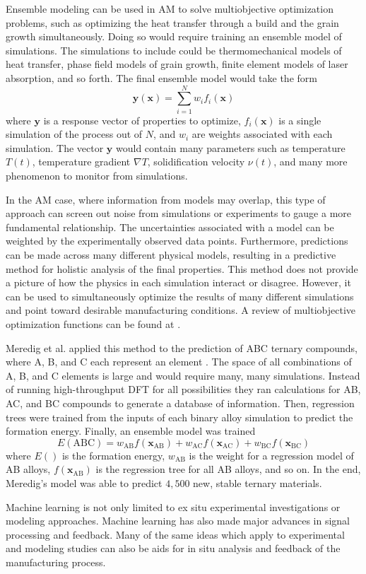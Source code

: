 Ensemble modeling can be used in AM to solve multiobjective optimization problems, such as optimizing the heat transfer through a build and the grain growth simultaneously. Doing so would require training an ensemble model of simulations. The simulations to include could be thermomechanical models of heat transfer, phase field models of grain growth, finite element models of laser absorption, and so forth. The final ensemble model would take the form
\begin{equation}
	\mathbf{y}(\mathbf{x}) = \sum_{i=1}^N w_i f_i(\mathbf{x})
	\label{ensemble}
\end{equation}
where $\mathbf{y}$ is a response vector of properties to optimize, $f_i(\mathbf{x})$ is a single simulation of the process out of $N$, and $w_i$ are weights associated with each simulation. The vector $\mathbf{y}$ would contain many parameters such as temperature $T(t)$, temperature gradient $\nabla T$, solidification velocity $\nu(t)$, and many more phenomenon to monitor from simulations. 

In the AM case, where information from models may overlap, this type of approach can screen out noise from simulations or experiments to gauge a more fundamental relationship. The uncertainties associated with a model can be weighted by the experimentally observed data points. Furthermore, predictions can be made across many different physical models, resulting in a predictive method for holistic analysis of the final properties. This method does not provide a picture of how the physics in each simulation interact or disagree. However, it can be used to simultaneously optimize the results of many different simulations and point toward desirable manufacturing conditions. A review of multiobjective optimization functions can be found at \cite{Jin2008}.

Meredig et al. applied this method to the prediction of ABC ternary compounds, where A, B, and C each represent an element \cite{Meredig2014}. The space of all combinations of A, B, and C elements is large and would require many, many simulations. Instead of running high-throughput DFT for all possibilities they ran calculations for AB, AC, and BC compounds to generate a database of information. Then, regression trees were trained from the inputs of each binary alloy simulation to predict the formation energy. Finally, an ensemble model was trained
\begin{equation}
	E(\text{ABC}) = w_{\text{AB}} f(\mathbf{x}_{\text{AB}}) + w_{\text{AC}} f(\mathbf{x}_{\text{AC}}) + w_{\text{BC}} f(\mathbf{x}_{\text{BC}})
	\label{dftensemble}
\end{equation}
where $E()$ is the formation energy, $w_\text{AB}$ is the weight for a regression model of AB alloys, $f(\mathbf{x}_{\text{AB}})$ is the regression tree for all AB alloys, and so on. In the end, Meredig's model was able to predict $4,500$ new, stable ternary materials. 

Machine learning is not only limited to ex situ experimental investigations or modeling approaches. Machine learning has also made major advances in signal processing and feedback. Many of the same ideas which apply to experimental and modeling studies can also be aids for in situ analysis and feedback of the manufacturing process. 